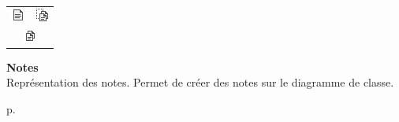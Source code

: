 \begin{minipage}[c]{.2\textwidth}
	\begin{rightborder}\begin{tabular}{cc}
		\includegraphics{images/icon/note.png} &
		\includegraphics{images/icon/linkNote.png} \\
		\multicolumn{2}{c}{\includegraphics{images/icon/multiNote.png}} \\
	\end{tabular}\end{rightborder}
\end{minipage}
\begin{minipage}[c]{.1\textwidth}\end{minipage}
\begin{minipage}[c]{.6\textwidth}
	\textbf{Notes} \\
	Représentation des notes. Permet de créer des notes sur le diagramme de classe.
\end{minipage}
\begin{minipage}[c]{.1\textwidth}
	\hfill
	p.{\LARGE \pageref{sec:notes}}
\end{minipage}

